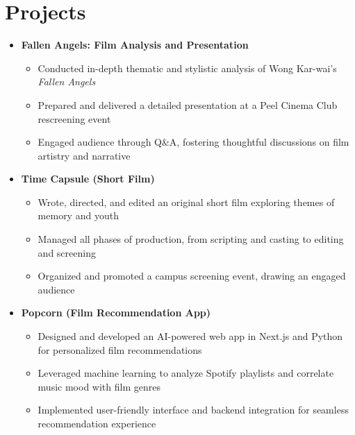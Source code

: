 \documentclass[letterpaper,11pt]{article}
\begin{document}
\section{Projects}
\begin{itemize}[leftmargin=0.15in, label={}]
  \item \textbf{Fallen Angels: Film Analysis and Presentation} \\
    \vspace{-6pt}
    \begin{itemize}
      \item Conducted in-depth thematic and stylistic analysis of Wong Kar-wai's \textit{Fallen Angels}
      \item Prepared and delivered a detailed presentation at a Peel Cinema Club rescreening event
      \item Engaged audience through Q\&A, fostering thoughtful discussions on film artistry and narrative
    \end{itemize}

  \item \textbf{Time Capsule (Short Film)} \\
    \vspace{-6pt}
    \begin{itemize}
      \item Wrote, directed, and edited an original short film exploring themes of memory and youth
      \item Managed all phases of production, from scripting and casting to editing and screening
      \item Organized and promoted a campus screening event, drawing an engaged audience
    \end{itemize}

  \item \textbf{Popcorn (Film Recommendation App)} \\
    \vspace{-6pt}
    \begin{itemize}
      \item Designed and developed an AI-powered web app in Next.js and Python for personalized film recommendations
      \item Leveraged machine learning to analyze Spotify playlists and correlate music mood with film genres
      \item Implemented user-friendly interface and backend integration for seamless recommendation experience
    \end{itemize}
\end{itemize}
\end{document}
